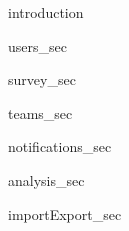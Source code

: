 {introduction}

{users_sec}

{survey_sec}

{teams_sec}

{notifications_sec}


{analysis_sec}

{importExport_sec}